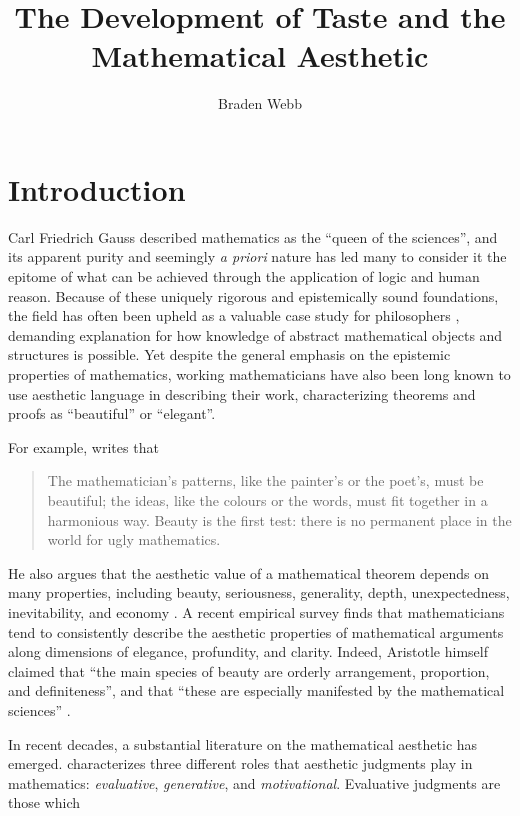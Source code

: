 \documentclass[a4paper,man,natbib]{apa6}
\title{The Development of Taste and the Mathematical Aesthetic}
\author{Braden Webb}
\affiliation{Department of Philosophy, Brigham Young University\\
PHIL 495R: Directed Readings in the Philosophy of Mathematics\\
Dr. Derek Haderlie\\
22 April 2023}
\begin{document}
\maketitle

\section{Introduction}
Carl Friedrich Gauss described mathematics as the ``queen of the sciences'', and its apparent purity and 
seemingly \textit{a priori} nature has led many to consider it the epitome of what can be achieved through
the application of logic and human reason. Because of these uniquely rigorous and epistemically sound
foundations, the field has often been upheld as a valuable case study for philosophers \citep{shapiro_thinking_2000},
demanding explanation for how knowledge of abstract mathematical objects and structures is possible. 
Yet despite the general emphasis on the epistemic properties of mathematics, working mathematicians have 
also been long known to use aesthetic language in describing their work, characterizing theorems and proofs as
``beautiful'' or ``elegant''. 

For example, \cite{hardy_mathematicians_1992} writes that
\begin{quotation}
      The mathematician’s patterns, like the painter’s or the poet’s, must be beautiful; the ideas, like the 
      colours or the words, must fit together in a harmonious way. Beauty is the first test: there is no 
      permanent place in the world for ugly mathematics.
\end{quotation}
He also argues that the aesthetic value of a mathematical theorem depends on many properties, including
beauty, seriousness, generality, depth, unexpectedness, inevitability, and 
economy \citep{hardy_mathematicians_1992}. A recent empirical survey \citep{johnson_intuitions_2019} finds that mathematicians
tend to consistently describe the aesthetic properties of mathematical arguments along dimensions of
elegance, profundity, and clarity. Indeed, Aristotle himself claimed that ``the main species of beauty are orderly 
arrangement, proportion, and definiteness'', and that ``these are especially manifested by the mathematical sciences''
\cite[VIII, 1078a]{aristotle_metaphysics_nodate}.

In recent decades, a substantial literature on the mathematical aesthetic has emerged. 
\cite{sinclair_roles_2004} characterizes three different roles that aesthetic judgments play in mathematics:
\textit{evaluative}, \textit{generative}, and \textit{motivational}. Evaluative judgments are those which
\end{document}
